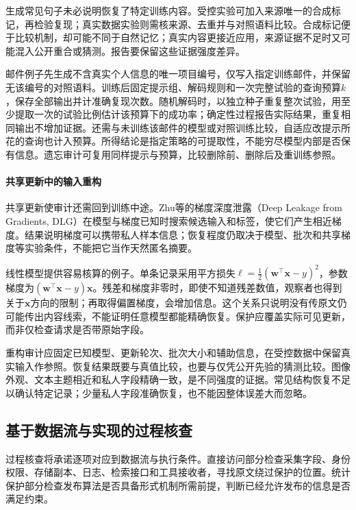 生成常见句子未必说明恢复了特定训练内容。受控实验可加入来源唯一的合成标记，再检验复现；真实数据实验则需核来源、去重并与对照语料比较。合成标记便于比较机制，却可能不同于自然记忆；真实内容更接近应用，来源证据不足时又可能混入公开重合或猜测。报告要保留这些证据强度差异。

邮件例子先生成不含真实个人信息的唯一项目编号，仅写入指定训练邮件，并保留无该编号的对照语料。训练后固定提示组、解码规则和一次完整试验的查询预算$k$，保存全部输出并计准确复现次数。随机解码时，以独立种子重复整次试验，用至少提取一次的试验比例估计该预算下的成功率；确定性过程报告实际结果，重复相同输出不增加证据。还需与未训练该邮件的模型或对照训练比较，自适应改提示所花的查询也计入预算。所得结论是指定策略的可提取性，不能穷尽模型内部是否保有信息。遗忘审计可复用同样提示与预算，比较删除前、删除后及重训练参照。

\paragraph{共享更新中的输入重构}

共享更新使审计还需回到训练中途。Zhu等的梯度深度泄露（Deep Leakage from Gradients, DLG）在模型与梯度已知时搜索候选输入和标签，使它们产生相近梯度。结果说明梯度可以携带私人样本信息；恢复程度仍取决于模型、批次和共享梯度等实验条件，不能把它当作天然匿名摘要。

线性模型提供容易核算的例子。单条记录采用平方损失$\ell=\tfrac12(\bm w^\top\bm x-y)^2$，参数梯度为$(\bm w^\top\bm x-y)\bm x$。残差和梯度非零时，即使不知道残差数值，观察者也得到关于$\bm x$方向的限制；再取得偏置梯度，会增加信息。这个关系只说明没有传原文仍可能传出内容线索，不能证明任意模型都能精确恢复。保护应覆盖实际可见更新，而非仅检查请求是否带原始字段。

重构审计应固定已知模型、更新轮次、批次大小和辅助信息，在受控数据中保留真实输入作参照。恢复结果既要与真值比较，也要与仅凭公开先验的猜测比较。图像外观、文本主题相近和私人字段精确一致，是不同强度的证据。常见结构恢复不足以确认特定记录；少量私人字段准确恢复，也不能因整体误差大而忽略。

\subsection{基于数据流与实现的过程核查}
\label{sec:privacy-implementation-verification}

过程核查将承诺逐项对应到数据流与执行条件。直接访问部分检查采集字段、身份权限、存储副本、日志、检索接口和工具接收者，寻找原文绕过保护的位置。统计保护部分检查发布算法是否具备形式机制所需前提，判断已经允许发布的信息是否满足约束。

